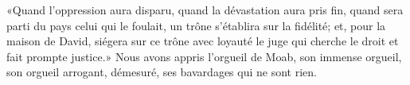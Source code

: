 «Quand l’oppression aura disparu, quand la dévastation aura pris fin,
	quand sera parti du pays celui qui le foulait,
	un trône s’établira sur la fidélité;
	et, pour la maison de David, siégera sur ce trône avec loyauté
	le juge qui cherche le droit et fait prompte justice.»
Nous avons appris l’orgueil de Moab,
	son immense orgueil, son orgueil arrogant, démesuré,
	ses bavardages qui ne sont rien.
